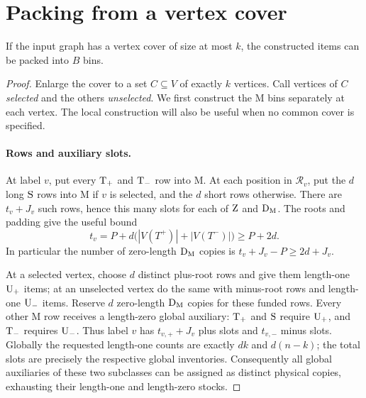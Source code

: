 \section{Packing from a vertex cover}\label{sec:completeness}

\begin{proposition}\label{prop:completeness}
If the input graph has a vertex cover of size at most $k$, the constructed
items can be packed into $B$ bins.
\end{proposition}

\begin{proof}
Enlarge the cover to a set $C\subseteq V$ of exactly $k$ vertices.
Call vertices of $C$ \emph{selected} and the others \emph{unselected}.
We first construct the $\mathrm M$ bins separately at each vertex.
The local construction will also be useful when no common cover is
specified.

\paragraph{Rows and auxiliary slots.}
At label $v$, put every $\mathrm{T}_{+}$ and $\mathrm{T}_{-}$ row into $\mathrm M$.
At each position in $\mathcal R_v$, put the $d$ long $\mathrm{S}$ rows
into $\mathrm M$ if $v$ is selected, and the $d$ short rows otherwise.
There are $t_v+J_v$ such rows, hence this many slots for each of
$\mathrm{Z}$ and $\mathrm{D}_{\mathrm M}$.
The roots and padding give the useful bound
\begin{equation}\label{eq:local-slot-bound}
 t_v=P+d\bigl(|V(T^+)|+|V(T^-)|\bigr)\ge P+2d.
\end{equation}
In particular the number of zero-length $\mathrm{D}_{\mathrm M}$ copies is
$t_v+J_v-P\ge2d+J_v$.

At a selected vertex, choose $d$ distinct plus-root rows and give
them length-one $\mathrm{U}_{+}$ items; at an unselected vertex do the same
with minus-root rows and length-one $\mathrm{U}_{-}$ items.  Reserve $d$
zero-length $\mathrm{D}_{\mathrm M}$ copies for these funded rows.
Every other $\mathrm M$ row receives a length-zero global auxiliary:
$\mathrm{T}_{+}$ and $\mathrm{S}$ require $\mathrm{U}_{+}$, and $\mathrm{T}_{-}$ requires $\mathrm{U}_{-}$.
Thus label $v$ has $t_{v,+}+J_v$ plus slots and $t_{v,-}$ minus
slots.  Globally the requested length-one counts are exactly $dk$
and $d(n-k)$; the total slots are precisely the respective global
inventories.  Consequently all global auxiliaries of these two
subclasses can be assigned as distinct physical copies, exhausting
their length-one and length-zero stocks.


\end{proof}
